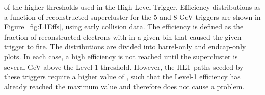 of the higher thresholds used in the High-Level Trigger.  
Efficiency distributions as a function of 
reconstructed supercluster \Et for the 5 and 8 GeV triggers 
are shown in Figure~\ref{fig:L1Effs}, 
using early collision data.  
The efficiency is defined as the fraction of reconstructed electrons 
with \Et in a given bin that caused the given trigger to fire.  
The distributions are divided into barrel-only and endcap-only plots.  
In each case, a high efficiency is not reached until 
the supercluster \Et is several GeV above the Level-1 threshold.  
However, the HLT paths seeded by these triggers require 
a higher value of \Et, 
such that the Level-1 efficiency has already reached the maximum value 
and therefore does not cause a problem.  

 \begin{figure}[htb]
  \begin{center}

\end{center}
\end{figure}
